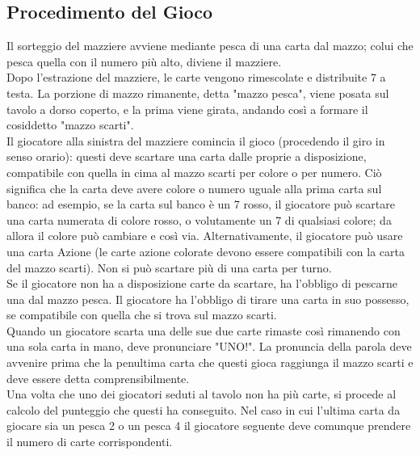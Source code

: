 		\subsection{Procedimento del Gioco}
			Il sorteggio del mazziere avviene mediante pesca di una carta dal mazzo; colui che pesca quella con il numero più alto, diviene il mazziere.	\\
			Dopo l'estrazione del mazziere, le carte vengono rimescolate e distribuite 7 a testa. La porzione di mazzo rimanente, detta "mazzo pesca", viene posata sul tavolo a dorso coperto, e la prima viene girata, andando così a formare il cosiddetto "mazzo scarti".\\
			Il giocatore alla sinistra del mazziere comincia il gioco (procedendo il giro in senso orario): questi deve scartare una carta dalle proprie a disposizione, compatibile con quella in cima al mazzo scarti per colore o per numero. Ciò significa che la carta deve avere colore o numero uguale alla prima carta sul banco: ad esempio, se la carta sul banco è un 7 rosso, il giocatore può scartare una carta numerata di colore rosso, o volutamente un 7 di qualsiasi colore; da allora il colore può cambiare e così via. Alternativamente, il giocatore può usare una carta Azione (le carte azione colorate devono essere compatibili con la carta del mazzo scarti). Non si può scartare più di una carta per turno.\\
			Se il giocatore non ha a disposizione carte da scartare, ha l'obbligo di pescarne una dal mazzo pesca. Il giocatore ha l'obbligo di tirare una carta in suo possesso, se compatibile con quella che si trova sul mazzo scarti. \\
			Quando un giocatore scarta una delle sue due carte rimaste così rimanendo con una sola carta in mano, deve pronunciare "UNO!". La pronuncia della parola deve avvenire prima che la penultima carta che questi gioca raggiunga il mazzo scarti e deve essere detta comprensibilmente.\\
			Una volta che uno dei giocatori seduti al tavolo non ha più carte, si procede al calcolo del punteggio che questi ha conseguito. Nel caso in cui l'ultima carta da giocare sia un pesca 2 o un pesca 4 il giocatore seguente deve comunque prendere il numero di carte corrispondenti.
		

